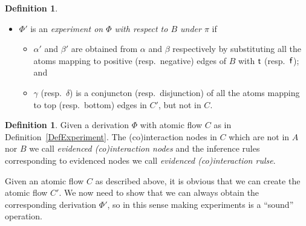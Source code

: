 \documentclass[a4paper]{amsart}
\theoremstyle{remark}
\theoremstyle{definition}
\newtheorem{defi}[thm]{Definition}
\begin{document}
\begin{defi}
\begin{itemize}
\item $\Phi'$ is an \emph{experiment on $\Phi$ with respect to $B$ under $\pi$} if
\begin{itemize}
 \item $\alpha'$ and $\beta'$ are obtained from $\alpha$ and $\beta$ respectively by substituting all the atoms mapping to positive (resp.\ negative) edges of $B$ with $\mathsf t$ (resp.\ $\mathsf f$); and
 \item $\gamma$ (resp.\ $\delta$) is a conjuncton (resp.\ disjunction) of all the atoms mapping to top (resp.\ bottom) edges in $C'$, but not in $C$.
\end{itemize}
\end{itemize}
\end{defi}

\begin{defi}
Given a derivation $\Phi$ with atomic flow $C$ as in Definition~\ref{DefExperiment}. The (co)interaction nodes in $C$ which are not in $A$ nor $B$ we call \emph{evidenced (co)interaction nodes} and the inference rules corresponding to evidenced nodes we call \emph{evidenced (co)interaction rulse}.
\end{defi}


Given an atomic flow $C$ as described above, it is obvious that we can create the atomic flow $C'$. We now need to show that we can always obtain the corresponding derivation $\Phi'$, so in this sense making experiments is a ``sound'' operation.
\end{document}
